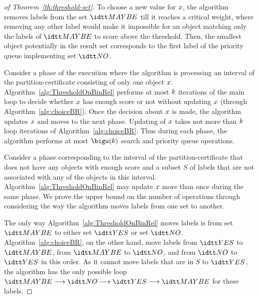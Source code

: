 \begin{PROOF}
\begin{proof}[of Theorem~\ref{th:threshold-set}]
      To choose a new value for $x$, the algorithm removes
      labels from the set $\setMAYBE$ till it reaches a critical
      weight, where removing any other label would make it impossible
      for an object matching only the labels of $\setMAYBE$ to score
      above the threshold.
      Then, the smallest object potentially in the result set
      corresponds to the first label of the priority queue
      implementing set $\setNO$.
 


      Consider a phase of the execution where the algorithm is
      processing an interval of the partition-certificate consisting
      of only one object $x$.
      Algorithm~\ref{alg:ThresholdOnBinRel} performs at most
      $k$ iterations of the main loop to decide whether
      $x$ has enough score or not without updating $x$
      (through Algorithm~\ref{alg:choiceBR}). Once the decision about
      $x$ is made, the algorithm updates $x$ and moves
      to the next phase. Updating of $x$ takes not more than
      $k$ loop iterations of Algorithm~\ref{alg:choiceBR}.
      Thus during each phase, the algorithm performs at most
      $\bigo(\nbkeywords)$ search and priority queue operations.

      Consider a phase corresponding to the interval of the
      partition-certificate that does not have any objects with enough
      score and a subset $S$ of labels that are not associated with
      any of the objects in this interval.
      Algorithm~\ref{alg:ThresholdOnBinRel} may update $x$ more
      than once during the same phase. We prove the upper bound on the
      number of operations through considering the way the algorithm
      moves labels from one set to another.
  
      The only way Algorithm~\ref{alg:ThresholdOnBinRel} moves labels
      is from set $\setMAYBE$ to either set $\setYES$ or set $\setNO$.
      Algorithm~\ref{alg:choiceBR}, on the other hand, move labels
      from $\setYES$ to $\setMAYBE$, from $\setMAYBE$ to $\setNO$, and
      from $\setNO$ to $\setYES$ in this order. As it cannot move
      labels that are in $S$ to $\setYES$, the algorithm has the only
      possible loop $\setMAYBE \longrightarrow \setNO \longrightarrow
      \setYES \longrightarrow \setMAYBE$ for these labels.
  

\end{proof}
\end{PROOF}
